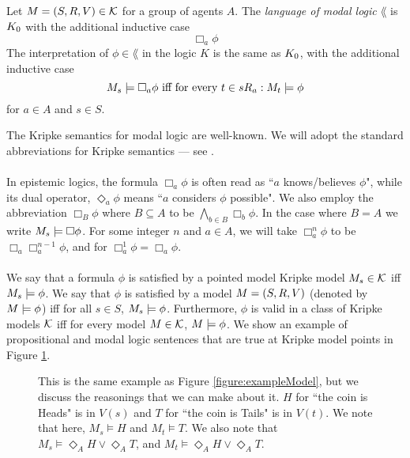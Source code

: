 \begin{defn} \label{modalLogic}
Let $M = (S, R, V) \in \mathcal{K}$ for a group of agents $A$.
The {\em language of modal logic} $\lang$ is $K_0$ with the additional inductive case
\[
	 \Box_a \phi
\]
The interpretation of $\phi \in \lang$ in the logic $K$ is the same as $K_0$, with the
additional inductive case
\[
	M_s \models \Box_a \phi \text{ iff for every }t \in s R_a: M_t \models \phi
\]
for $a \in A$ and $s \in S$.
\end{defn}
The Kripke semantics for modal logic are well-known.
We will adopt the standard abbreviations for Kripke semantics --- see \cite{blackburn2002modal}.\\
\\
In epistemic logics, the formula $\Box_a \phi$ is often read as ``$a$ knows/believes $\phi$", while
its dual operator, $\Diamond_a \phi$ means ``$a$ considers $\phi$ possible".
We also employ the abbreviation $\Box_B \phi$ where $B \subseteq A$ to be $\bigwedge_{b \in B}
\Box_b \phi$.
In the case where $B = A$ we write $M_s \models \Box \phi$.
For some integer $n$ and $a \in A$, we will take $\Box^n_a \phi$ to be $\Box_a \Box^{n-1}_a \phi$,
and for $\Box^1_a \phi = \Box_a \phi$.\\
\\
We say that a formula $\phi$ is satisfied by a pointed model Kripke model $M_s \in \mathcal{K}$ iff
$M_s \models \phi$.
We say that $\phi$ is satisfied by a model $M = (S, R, V)$ (denoted by
    $M \models \phi$) iff
for all $s \in S$, $M_s \models \phi$.
Furthermore, $\phi$ is valid in a class of Kripke models $\mathcal{K}$ iff for
every model $M \in
\mathcal{K}$, $M \models \phi$.
We show an example of propositional and modal logic sentences that are true at Kripke model points in
Figure \ref{figure:exampleReasonings}.

\begin{figure}
\centering
{}
\caption[Example reasonings at each Kripke point]{This is the same example as Figure \ref{figure:exampleModel}, but we discuss the reasonings
that we can make about it.
$H$ for ``the coin is Heads" is in $V(s)$ and $T$ for ``the coin is Tails" is in $V(t)$.
We note that here, $M_s \models H$ and $M_t \models T$.
We also note that $M_s \models \Diamond_A H \lor \Diamond_A T$, and $M_t \models \Diamond_A H \lor
\Diamond_A T$.}
\label{figure:exampleReasonings}
\end{figure}

